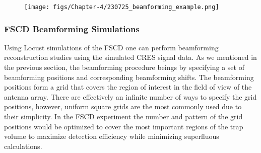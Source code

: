 \begin{figure}
    \centering
    \texttt{[image: figs/Chapter-4/230725\_beamforming\_example.png]}
    \caption{}
\end{figure}


\subsubsection*{FSCD Beamforming Simulations}

Using Locust simulations of the FSCD one can perform beamforming reconstruction studies using the simulated CRES signal data. As we mentioned in the previous section, the beamforming procedure beings by specifying a set of beamforming positions and corresponding beamforming shifts. The beamforming positions form a grid that covers the region of interest in the field of view of the antenna array. There are effectively an infinite number of ways to specify the grid positions, however, uniform square grids are the most commonly used due to their simplicity. In the FSCD experiment the number and pattern of the grid positions would be optimized to cover the most important regions of the trap volume to maximize detection efficiency while minimizing superfluous calculations.

